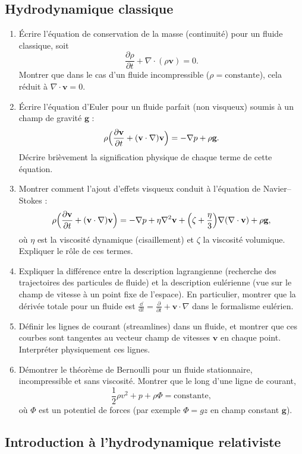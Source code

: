 \documentclass[a4paper,10pt]{report}
\begin{document}
\subsection{Hydrodynamique classique}
\begin{enumerate}
	\item Écrire l'équation de conservation de la masse (continuité) pour un fluide classique, soit 
	\[
	\frac{\partial \rho}{\partial t} + \nabla \cdot (\rho \textbf{v}) = 0.
	\]
	Montrer que dans le cas d'un fluide incompressible ($\rho=\text{constante}$), cela réduit à $\nabla \cdot \textbf{v} = 0$.
	\item Écrire l'équation d'Euler pour un fluide parfait (non visqueux) soumis à un champ de gravité $\textbf{g}$ :
	\[
	\rho\Bigl(\frac{\partial \textbf{v}}{\partial t} + (\textbf{v}\cdot\nabla)\textbf{v}\Bigr) = -\nabla p + \rho \textbf{g}.
	\]
	Décrire brièvement la signification physique de chaque terme de cette équation.
	\item Montrer comment l'ajout d'effets visqueux conduit à l'équation de Navier–Stokes :
	\[
	\rho\Bigl(\frac{\partial \textbf{v}}{\partial t} + (\textbf{v}\cdot\nabla)\textbf{v}\Bigr)
	= -\nabla p + \eta \nabla^2 \textbf{v} + \Bigl(\zeta+\frac{\eta}{3}\Bigr)\nabla(\nabla\cdot\textbf{v}) + \rho \textbf{g},
	\]
	où $\eta$ est la viscosité dynamique (cisaillement) et $\zeta$ la viscosité volumique. Expliquer le rôle de ces termes.
	\item Expliquer la différence entre la description lagrangienne (recherche des trajectoires des particules de fluide) et la description eulérienne (vue sur le champ de vitesse à un point fixe de l'espace). En particulier, montrer que la dérivée totale pour un fluide est $\frac{\dd}{\text{d}t}=\frac{\partial}{\partial t} + \textbf{v}\cdot\nabla$ dans le formalisme eulérien.
	\item Définir les lignes de courant (streamlines) dans un fluide, et montrer que ces courbes sont tangentes au vecteur champ de vitesses $\textbf{v}$ en chaque point. Interpréter physiquement ces lignes.
	\item Démontrer le théorème de Bernoulli pour un fluide stationnaire, incompressible et sans viscosité. Montrer que le long d'une ligne de courant,
	\[
	\frac{1}{2}\rho v^2 + p + \rho\Phi = \text{constante},
	\]
	où $\Phi$ est un potentiel de forces (par exemple $\Phi= g z$ en champ constant $\textbf{g}$).
\end{enumerate}
\subsection{Introduction à l’hydrodynamique relativiste}
\end{document}
